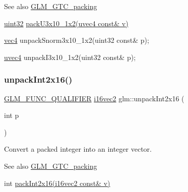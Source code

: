 \begin{DoxySeeAlso}{See also}
\hyperlink{group__gtc__packing}{G\+L\+M\+\_\+\+G\+T\+C\+\_\+packing} 

\hyperlink{group__gtc__type__precision_ga202b6a53c105fcb7e531f9b443518451}{uint32} \hyperlink{group__gtc__packing_gaf656d8862628f96b20de7a36eaa1fe56}{pack\+U3x10\+\_\+1x2(uvec4 const\& v)} 

\hyperlink{group__core__types_ga5881b1b022d7fd1b7218f5916532dd02}{vec4} unpack\+Snorm3x10\+\_\+1x2(uint32 const\& p); 

\hyperlink{group__core__types_ga1c426d19627b32b14f0089f7f4ba7b1d}{uvec4} unpack\+I3x10\+\_\+1x2(uint32 const\& p); 
\end{DoxySeeAlso}
\mbox{\label{group__gtc__packing_ga639c216b452fc364b32c15eb5b8b6a87}} 
\subsubsection{\texorpdfstring{unpack\+Int2x16()}{unpackInt2x16()}}
{\footnotesize\ttfamily \hyperlink{setup_8hpp_a33fdea6f91c5f834105f7415e2a64407}{G\+L\+M\+\_\+\+F\+U\+N\+C\+\_\+\+Q\+U\+A\+L\+I\+F\+I\+ER} \hyperlink{group__gtc__type__precision_gad912fd04abb876a5b806118ec6e0f283}{i16vec2} glm\+::unpack\+Int2x16 (\begin{DoxyParamCaption}\item[{int}]{p }\end{DoxyParamCaption})}

Convert a packed integer into an integer vector.

\begin{DoxySeeAlso}{See also}
\hyperlink{group__gtc__packing}{G\+L\+M\+\_\+\+G\+T\+C\+\_\+packing} 

int \hyperlink{group__gtc__packing_ga0182984c14b2b59fd74e72af3f3b4bb9}{pack\+Int2x16(i16vec2 const\& v)} 
\end{DoxySeeAlso}
\mbox{\label{group__gtc__packing_ga6410b50fa48d15e70b2c34174ee4a3fc}} 
